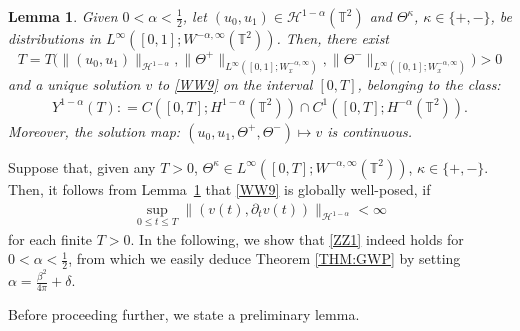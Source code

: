 \documentclass[letterpaper, 11pt,  reqno]{amsart}
\newtheorem{lemma}[theorem]{Lemma}
\theoremstyle{myremark}
\newcommand{\Ta}{\Theta}
\newcommand{\1}{\hspace{0.5mm}\text{I}\hspace{0.5mm}}
\newcommand{\T}{\mathbb{T}}
\newcommand{\al}{\alpha}
\newcommand{\be}{\beta}
\newcommand{\dl}{\delta}
\newcommand{\kk}{\kappa}
\newcommand{\dt}{\partial_t}
\renewcommand{\H}{\mathcal{H}}
\newcommand{\U}{\Theta}
\numberwithin{equation}{section}
\numberwithin{theorem}{section}
\begin{document}
\begin{lemma}\label{LEM:LWP}
Given $0<\al <\frac12$, 
let $(u_0, u_1) \in \H^{1-\al}(\T^2)$
 and 
 $\U^\kk$, $\kk \in \{+, -\}$,  be distributions in $L^\infty([0,1];W^{-\al,\infty}(\T^2))$. %
 Then,  there exist
 \[T = T\Big(\| (u_0, u_1)\|_{\H^{1-\al}}, 
 \|\Ta^+\|_{L^\infty([0,1];W^{-\al,\infty}_x)},  \|\Ta^-\|_{L^\infty([0,1];W^{-\al,\infty}_x)}\Big)> 0\]
 and a unique solution $v$ to \eqref{WW9} 
 on the interval $[0, T]$, belonging to  the class\textup{:}
 \begin{align*}
 Y^{1-\al}(T): =  C([0,T];H^{1-\al}(\T^2))\cap C^1([0,T];H^{-\al}(\T^2)). %
 \end{align*} 
 Moreover, the solution map\textup{:} $(u_0, u_1, \Ta^+, \Ta^-) \mapsto v$ is continuous.
\end{lemma}








Suppose that, given any $T > 0$, 
$\Ta^\kk \in L^\infty([0,T];W^{-\al,\infty}(\T^2))$, $\kk \in \{+, -\}$. 
Then, it follows from Lemma~\ref{LEM:LWP}
that \eqref{WW9} is globally well-posed, 
if 
\begin{align}
 \sup_{0 \le t \le T}
\|(v(t), \dt v(t))\|_{\H^{1- \al}} < \infty
\label{ZZ1}
\end{align}
for each finite $T> 0$.
In the following, we show that \eqref{ZZ1} indeed holds
for $0<\al <\frac12$, 
from which we easily deduce Theorem \ref{THM:GWP}
by setting 
$\al = \frac{\be^2}{4\pi} + \dl$. %










Before proceeding further, 
we state a preliminary lemma.
\end{document}
